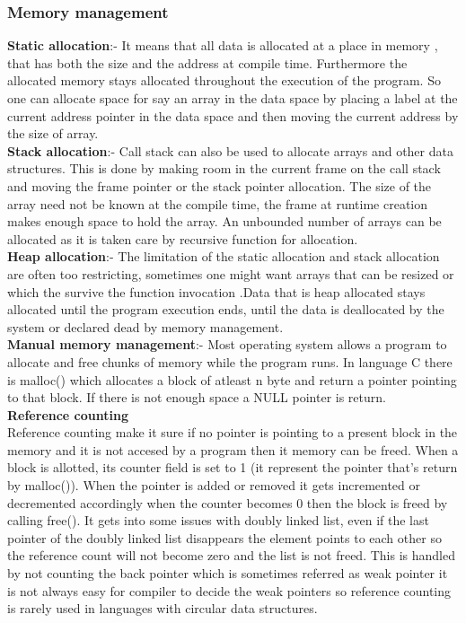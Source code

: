 \documentclass[23pt]{article}
\begin{document}
\subsubsection{Memory management}
{\Large \textbf{Static allocation}:- It means that all data is allocated at a place in memory , that has both the size and the address at compile time. Furthermore the allocated memory stays allocated throughout the execution of the program. So one can allocate space for say an array in the data space by placing a label at the current address pointer in the data space and then moving the current address by the size of array. \\
\textbf{Stack allocation}:- Call stack can also be used to allocate arrays and other data structures. This is done by making room in the current frame on the call stack and moving the frame pointer or the stack pointer allocation. The size of the array need not be known at the compile time, the frame at runtime creation makes enough space to hold the array. An unbounded number of arrays can be allocated as it is taken care by recursive function for allocation. \\ 
\textbf{Heap allocation}:- The limitation of the static allocation and stack allocation are often too restricting, sometimes one might want arrays that can be resized or which the survive the function invocation .Data that is heap allocated stays allocated until the program execution ends, until the data is deallocated by the system or declared dead by memory management. \\
\textbf{Manual memory management}:- Most operating system allows a program to allocate and free chunks of memory while the program runs. In language C there is malloc() which allocates a block of atleast n byte and return a pointer pointing to that block. If there is not enough space a NULL pointer is return. \\ 
\textbf{Reference counting} \\
Reference counting make it sure if no pointer is pointing to a present block in the memory and it is not accesed by a program then it memory can be freed. When a block is allotted, its counter field is set to 1 (it represent the pointer that’s return by malloc()). When the pointer is added or removed it gets incremented or decremented accordingly when the counter becomes 0 then the block is freed by calling free(). It gets into some issues with doubly linked list, even if the last pointer of the doubly linked list disappears the element points to each other so the reference count will not become zero and the list is not freed. This is handled by not counting the back pointer which is sometimes referred as weak pointer it is not always easy for compiler to decide the weak pointers so reference counting is rarely used in languages with circular data structures.
}
\end{document}

